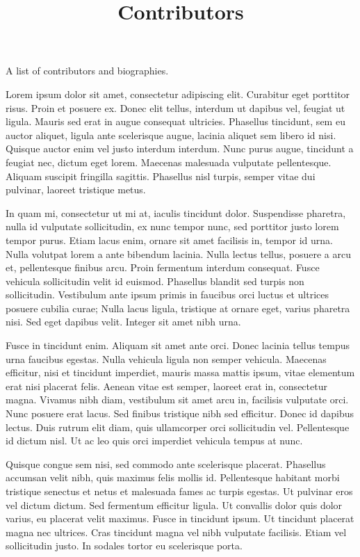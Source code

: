 \documentclass{article}
\begin{document}
\title{Contributors}

\maketitle


A list of contributors and biographies.


Lorem ipsum dolor sit amet, consectetur adipiscing elit. Curabitur eget porttitor risus. Proin et posuere ex. Donec elit tellus, interdum ut dapibus vel, feugiat ut ligula. Mauris sed erat in augue consequat ultricies. Phasellus tincidunt, sem eu auctor aliquet, ligula ante scelerisque augue, lacinia aliquet sem libero id nisi. Quisque auctor enim vel justo interdum interdum. Nunc purus augue, tincidunt a feugiat nec, dictum eget lorem. Maecenas malesuada vulputate pellentesque. Aliquam suscipit fringilla sagittis. Phasellus nisl turpis, semper vitae dui pulvinar, laoreet tristique metus.


In quam mi, consectetur ut mi at, iaculis tincidunt dolor. Suspendisse pharetra, nulla id vulputate sollicitudin, ex nunc tempor nunc, sed porttitor justo lorem tempor purus. Etiam lacus enim, ornare sit amet facilisis in, tempor id urna. Nulla volutpat lorem a ante bibendum lacinia. Nulla lectus tellus, posuere a arcu et, pellentesque finibus arcu. Proin fermentum interdum consequat. Fusce vehicula sollicitudin velit id euismod. Phasellus blandit sed turpis non sollicitudin. Vestibulum ante ipsum primis in faucibus orci luctus et ultrices posuere cubilia curae; Nulla lacus ligula, tristique at ornare eget, varius pharetra nisi. Sed eget dapibus velit. Integer sit amet nibh urna.


Fusce in tincidunt enim. Aliquam sit amet ante orci. Donec lacinia tellus tempus urna faucibus egestas. Nulla vehicula ligula non semper vehicula. Maecenas efficitur, nisi et tincidunt imperdiet, mauris massa mattis ipsum, vitae elementum erat nisi placerat felis. Aenean vitae est semper, laoreet erat in, consectetur magna. Vivamus nibh diam, vestibulum sit amet arcu in, facilisis vulputate orci. Nunc posuere erat lacus. Sed finibus tristique nibh sed efficitur. Donec id dapibus lectus. Duis rutrum elit diam, quis ullamcorper orci sollicitudin vel. Pellentesque id dictum nisl. Ut ac leo quis orci imperdiet vehicula tempus at nunc.


Quisque congue sem nisi, sed commodo ante scelerisque placerat. Phasellus accumsan velit nibh, quis maximus felis mollis id. Pellentesque habitant morbi tristique senectus et netus et malesuada fames ac turpis egestas. Ut pulvinar eros vel dictum dictum. Sed fermentum efficitur ligula. Ut convallis dolor quis dolor varius, eu placerat velit maximus. Fusce in tincidunt ipsum. Ut tincidunt placerat magna nec ultrices. Cras tincidunt magna vel nibh vulputate facilisis. Etiam vel sollicitudin justo. In sodales tortor eu scelerisque porta.
\end{document}
